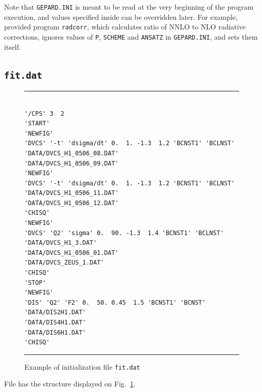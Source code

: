 \documentclass[12pt]{article}
\begin{document}
Note that \texttt{GEPARD.INI} is meant to be read at the very beginning of the
program execution, and values specified inside can be overridden later. For
example, provided program \texttt{radcorr}, which calculates ratio of NNLO to NLO
radiative corrections, ignores values of \texttt{P}, \texttt{SCHEME} and
\texttt{ANSATZ} in \texttt{GEPARD.INI}, and sets them itself.


\subsection{\texttt{fit.dat}\label{sec:fit.dat}}

\begin{figure}[t]
\begin{center}
\hrule
\begin{verbatim}

'/CPS' 3  2
'START'
'NEWFIG'
'DVCS' '-t' 'dsigma/dt' 0.  1. -1.3  1.2 'BCNST1' 'BCLNST'
'DATA/DVCS_H1_0506_08.DAT'
'DATA/DVCS_H1_0506_09.DAT'
'NEWFIG'
'DVCS' '-t' 'dsigma/dt' 0.  1. -1.3  1.2 'BCNST1' 'BCLNST'
'DATA/DVCS_H1_0506_11.DAT'
'DATA/DVCS_H1_0506_12.DAT'
'CHISQ'
'NEWFIG'
'DVCS' 'Q2' 'sigma' 0.  90. -1.3  1.4 'BCNST1' 'BCLNST'
'DATA/DVCS_H1_3.DAT'
'DATA/DVCS_H1_0506_01.DAT'
'DATA/DVCS_ZEUS_1.DAT'
'CHISQ'
'STOP'
'NEWFIG'
'DIS' 'Q2' 'F2' 0.  50. 0.45  1.5 'BCNST1' 'BCNST'
'DATA/DIS2H1.DAT'
'DATA/DIS4H1.DAT'
'DATA/DIS6H1.DAT'
'CHISQ'

\end{verbatim}
\hrule
\end{center}
\caption{Example of initialization file \texttt{fit.dat}}
\label{fig:fit.dat}
\end{figure}

File has the structure displayed on Fig.~\ref{fig:fit.dat}.
\end{document}
